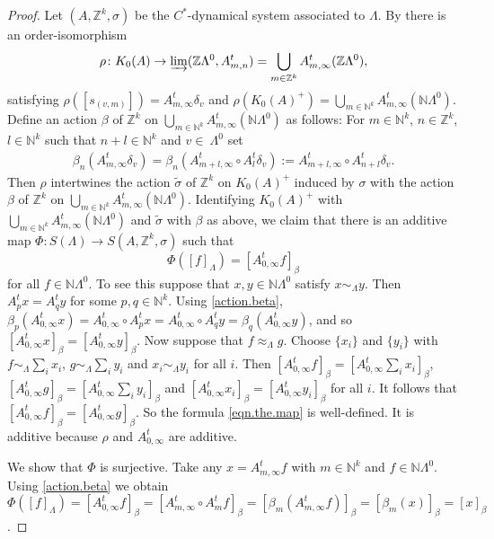 \documentclass[a4paper, 12pt]{amsart}
\numberwithin{equation}{section}
\theoremstyle{remark}
\theoremstyle{definition}
\begin{document}
\begin{proof}
Let $(A,{\mathbb{Z}}^k,\sigma)$ be the $C^*$-dynamical system associated to $\Lambda$. By
\cite[Lemma~3.4]{MR3507995} there is an order-isomorphism
$$\rho\colon K_0(A)\to \varinjlim({\mathbb{Z}}\Lambda^0, A^t_{m,n})=\bigcup_{m\in {\mathbb{Z}}^k} A^t_{m,\infty} ({\mathbb{Z}} \Lambda^0),$$
satisfying $\rho([s_{(v,m)}])=A^t_{m,\infty}\delta_v$ and $\rho(K_0(A)^+)=\bigcup_{m\in
{\mathbb{N}}^k} A^t_{m,\infty} ({\mathbb{N}} \Lambda^0)$. Define an action $\beta$ of ${\mathbb{Z}}^k$ on $\bigcup_{m\in {\mathbb{N}}^k} A^t_{m,\infty} ({\mathbb{N}} \Lambda^0)$ as follows: For $m\in {\mathbb{N}}^k$, $n\in {\mathbb{Z}}^k$, $l\in {\mathbb{N}}^k$ such that $n+l\in {\mathbb{N}}^k$ and $v\in\
\Lambda^0$ set
\begin{eqnarray}\label{action.beta}
\beta_n(A^t_{m,\infty}\delta_v)=\beta_n(A^t_{m+l,\infty}\circ A^t_{l}\delta_v):=A^t_{m+l,\infty} \circ A^t_{n+l}\delta_v.
\end{eqnarray}
Then $\rho$ intertwines the action
$\tilde\sigma$ of ${\mathbb{Z}}^k$ on $K_0(A)^+$ induced by $\sigma$ with the action $\beta$ of
${\mathbb{Z}}^k$ on $\bigcup_{m\in {\mathbb{N}}^k} A^t_{m,\infty} ({\mathbb{N}} \Lambda^0)$.
Identifying $K_0(A)^+$ with $\bigcup_{m\in {\mathbb{N}}^k} A^t_{m,\infty} ({\mathbb{N}} \Lambda^0)$ and
$\tilde\sigma$ with $\beta$ as above, we claim that there is an additive map $\Phi\colon
S(\Lambda) \to S(A,{\mathbb{Z}}^k,\sigma)$ such that
 \begin{equation}\label{eqn.the.map}
 \Phi([f]_\Lambda)= [A^t_{0,\infty}f]_\beta
 \end{equation}
 for all $f\in {\mathbb{N}}\Lambda^0$. To see this suppose that $x,y\in {\mathbb{N}}\Lambda^0$ satisfy $x\sim_\Lambda y$. Then $A^t_px=A^t_qy$ for some $p,q\in {\mathbb{N}}^k$. Using \eqref{action.beta}, $\beta_p(A^t_{0,\infty}x)=A^t_{0,\infty} \circ A^t_px=A^t_{0,\infty} \circ A^t_qy=\beta_q(A^t_{0,\infty}y)$, and so $[A^t_{0,\infty}x]_\beta=[A^t_{0,\infty}y]_\beta$. Now suppose that $f\approx_{\Lambda} g$. Choose $\{x_i\}$ and $\{y_i\}$ with $f\sim_{\Lambda}\sum_i x_i$, $g\sim_{\Lambda}\sum_i y_i$ and $x_i\sim_{\Lambda} y_i$ for all $i$. Then $[A^t_{0,\infty}f]_\beta=[A^t_{0,\infty}\sum_ix_i]_\beta$, $[A^t_{0,\infty}g]_\beta=[A^t_{0,\infty}\sum_iy_i]_\beta$ and $[A^t_{0,\infty}x_i]_\beta=[A^t_{0,\infty}y_i]_\beta$ for all $i$. It follows that $[A^t_{0,\infty}f]_\beta=[A^t_{0,\infty}g]_\beta$. So the formula \eqref{eqn.the.map} is well-defined. It is additive because $\rho$ and $A^t_{0,\infty}$ are additive.

We show that $\Phi$ is surjective. Take any $x=A^t_{m,\infty}f$ with $m\in {\mathbb{N}}^k$ and
$f\in {\mathbb{N}}\Lambda^0$. Using \eqref{action.beta} we obtain
$\Phi({{[{f}]_\Lambda}})=[A^t_{0,\infty}f]_\beta=[A^t_{m,\infty} \circ
A^t_mf]_\beta=[\beta_m(A^t_{m,\infty}f)]_\beta=[\beta_m(x)]_\beta=[x]_\beta$.


\end{proof}
\end{document}
